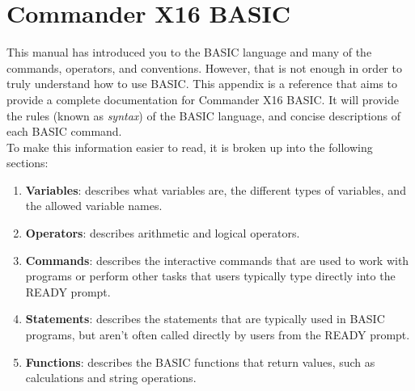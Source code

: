 \chapter{Commander X16 BASIC}

This manual has introduced you to the BASIC language and many of the commands,
operators, and conventions.  However, that is not enough in order to truly
understand how to use BASIC.  This appendix is a reference that aims to provide
a complete documentation for Commander X16 BASIC.  It will provide the rules
(known as \emph{syntax}) of the BASIC language, and concise descriptions of
each BASIC command.\\

To make this information easier to read, it is broken up into the following
sections:\\

\begin{enumerate}

	\item {\bfseries Variables}: describes what variables are, the different
		types of variables, and the allowed variable names.

	\item {\bfseries Operators}: describes arithmetic and logical operators.

	\item {\bfseries Commands}: describes the interactive commands that are
		used to work with programs or perform other tasks that users typically
		type directly into the {\ttfamily READY} prompt.

	\item {\bfseries Statements}: describes the statements that are typically
		used in BASIC programs, but aren't often called directly by users from
		the {\ttfamily READY} prompt.

	\item {\bfseries Functions}: describes the BASIC functions that return
		values, such as calculations and string operations.

\end{enumerate}

\vspace{16pt}


